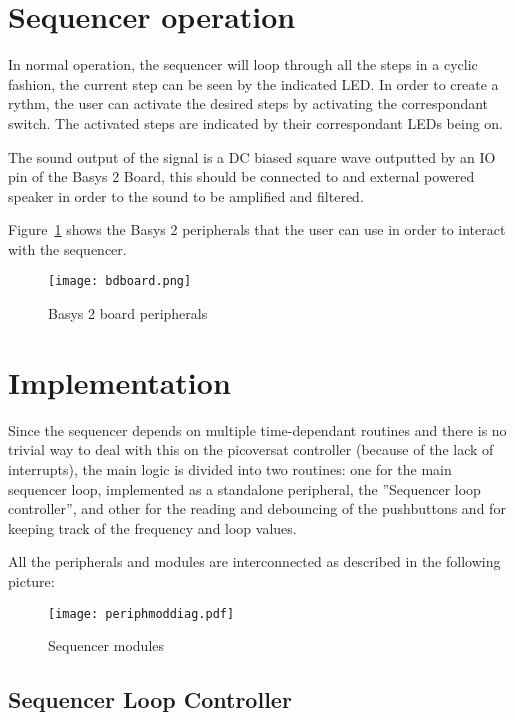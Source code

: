 
\section{Sequencer operation}



In normal operation, the sequencer will loop through all the steps in a cyclic fashion, the current step can be seen by the indicated LED. In order to create a rythm, the user can activate the desired steps by activating the correspondant switch. The activated steps are indicated by their correspondant LEDs being on.  

The sound output of the signal is a DC biased square wave outputted by an IO pin of the Basys 2 Board, this should be connected to and external powered speaker in order to the sound to be amplified and filtered.


Figure~\ref{fig:bdbasys2} shows the Basys 2 peripherals that the user can use in order to interact with the sequencer.

\begin{figure}[!h]
  \centerline{\texttt{[image: bdboard.png]}}
  \vspace{0cm}\caption{Basys 2 board peripherals}
  \label{fig:bdbasys2}
\end{figure}

\section{Implementation}


Since the sequencer depends on multiple time-dependant routines and there is no trivial way to deal with this on the picoversat controller (because of the lack of interrupts), the main logic is divided into two routines: one for the main sequencer loop, implemented as a standalone peripheral, the ''Sequencer loop controller'', and other for the reading and debouncing of the pushbuttons and for keeping track of the frequency and loop values.


\noindent All the peripherals and modules are interconnected as described in the following picture:

\begin{figure}[!htbp]
  \centerline{\texttt{[image: periphmoddiag.pdf]}}
  \vspace{0cm}\caption{Sequencer modules}
  \label{fig:periphmoddiag}
\end{figure}


\subsection{Sequencer Loop Controller}


